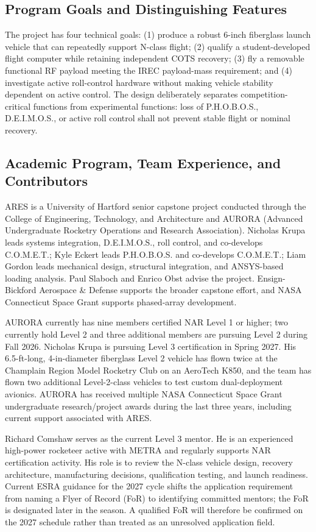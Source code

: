 \documentclass[10pt]{article}
\newcommand{\COMET}{C.O.M.E.T.}
\newcommand{\DEIMOS}{D.E.I.M.O.S.}
\newcommand{\PHOBOS}{P.H.O.B.O.S.}
\begin{document}
\subsection{Program Goals and Distinguishing Features}
The project has four technical goals: (1) produce a robust 6-inch fiberglass launch vehicle that can repeatedly support N-class flight; (2) qualify a student-developed flight computer while retaining independent COTS recovery; (3) fly a removable functional RF payload meeting the IREC payload-mass requirement; and (4) investigate active roll-control hardware without making vehicle stability dependent on active control. The design deliberately separates competition-critical functions from experimental functions: loss of \PHOBOS{}, \DEIMOS{}, or active roll control shall not prevent stable flight or nominal recovery.

\subsection{Academic Program, Team Experience, and Contributors}
ARES is a University of Hartford senior capstone project conducted through the College of Engineering, Technology, and Architecture and AURORA (Advanced Undergraduate Rocketry Operations and Research Association). Nicholas Krupa leads systems integration, \DEIMOS{}, roll control, and co-develops \COMET{}; Kyle Eckert leads \PHOBOS{} and co-develops \COMET{}; Liam Gordon leads mechanical design, structural integration, and ANSYS-based loading analysis. Paul Slaboch and Enrico Obst advise the project. Ensign-Bickford Aerospace \& Defense supports the broader capstone effort, and NASA Connecticut Space Grant supports phased-array development.

AURORA currently has nine members certified NAR Level 1 or higher; two currently hold Level 2 and three additional members are pursuing Level 2 during Fall 2026. Nicholas Krupa is pursuing Level 3 certification in Spring 2027. His 6.5-ft-long, 4-in-diameter fiberglass Level 2 vehicle has flown twice at the Champlain Region Model Rocketry Club on an AeroTech K850, and the team has flown two additional Level-2-class vehicles to test custom dual-deployment avionics. AURORA has received multiple NASA Connecticut Space Grant undergraduate research/project awards during the last three years, including current support associated with ARES.

Richard Comshaw serves as the current Level 3 mentor. He is an experienced high-power rocketeer active with METRA and regularly supports NAR certification activity. His role is to review the N-class vehicle design, recovery architecture, manufacturing decisions, qualification testing, and launch readiness. Current ESRA guidance for the 2027 cycle shifts the application requirement from naming a Flyer of Record (FoR) to identifying committed mentors; the FoR is designated later in the season. A qualified FoR will therefore be confirmed on the 2027 schedule rather than treated as an unresolved application field.
\end{document}
